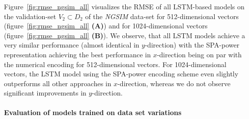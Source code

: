 Figure~\ref{fig:rmse_ngsim_all} visualizes the \ac{RMSE} of all \ac{LSTM}-based models on the validation-set $V_2 \subset D_2$ of the \emph{\ac{NGSIM}} data-set for \num{512}-dimensional vectors (figure~\ref{fig:rmse_ngsim_all} \textbf{(A)}) and for \num{1024}-dimensional vectors (figure~\ref{fig:rmse_ngsim_all} \textbf{(B)}).
We observe, that all \ac{LSTM} models achieve a very similar performance (almost identical in $y$-direction) with the \ac{SPA}-power representation achieving the best performance in $x$-direction being on par with the numerical encoding for \num{512}-dimensional vectors.
For \num{1024}-dimensional vectors, the \ac{LSTM} model using the \ac{SPA}-power encoding scheme even slightly outperforms all other approaches in $x$-direction, whereas we do not observe significant improvements in $y$-direction.

\paragraph{Evaluation of models trained on data set variations}%
\label{par:evaluation_of_models_trained_on_data_set_variations}

